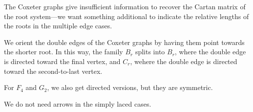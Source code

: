 The Coxeter graphs give insufficient information to recover the Cartan
matrix of the root system---we want something additional to indicate the
relative lengths of the roots in the multiple edge cases.

We orient the double edges of the Coxeter graphs by having them point towards
the shorter root. In this way, the family $B_r$ splits into $B_r$, where
the double edge is directed toward the final vertex, and $C_r$, wehere the
double edge is directed toward the second-to-last vertex.

For $F_4$ and $G_2$, we also get directed versions, but they are symmetric.

We do not need arrows in the simply laced cases.

